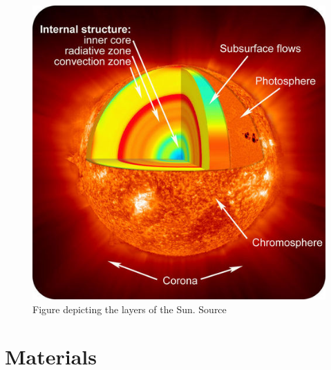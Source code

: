 \documentclass[12pt]{article}
\begin{document}
\begin{figure}[H]
\centering
\includegraphics[scale=2.0]{Media/Document/201412291419879042243664_ce790b2e534a8859f7524dbfa6be7409-201412291419879560552576.jpg}
\caption{Figure depicting the layers of the Sun. Source \cite{TheSun}}
\label{TheSun}
\end{figure}

\section{Materials}
\label{Materials}
\end{document}
